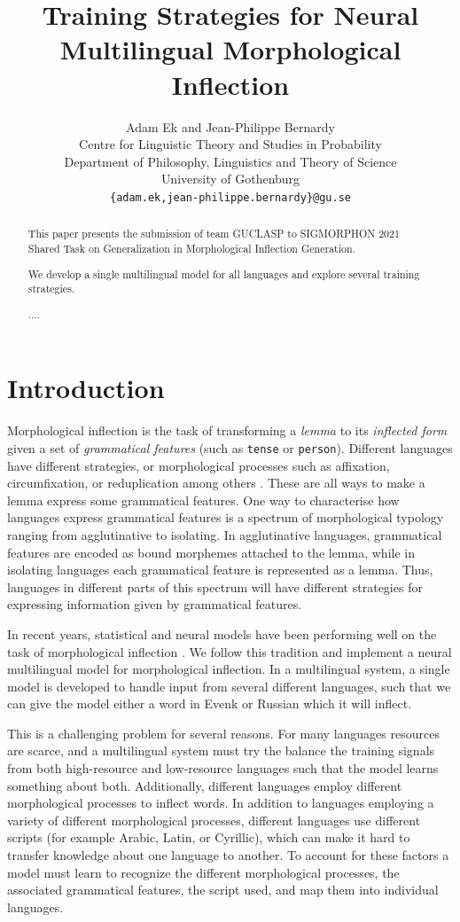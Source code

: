 \documentclass[11pt,a4paper]{article}
\title{Training Strategies for Neural Multilingual Morphological Inflection}
\author{Adam Ek and Jean-Philippe Bernardy \\
	Centre for Linguistic Theory and Studies in Probability \\
	Department of Philosophy, Linguistics and Theory of Science \\
	University of Gothenburg \\
	\texttt{\{adam.ek,jean-philippe.bernardy\}@gu.se} \\}
\date{}
\begin{document}
\maketitle
\begin{abstract}
This paper presents the submission of team GUCLASP to SIGMORPHON
2021 Shared Task on Generalization in Morphological Inflection
Generation. 

We develop a single multilingual model for all languages and explore
several training strategies.

....
\end{abstract}

\section{Introduction}

Morphological inflection is the task of transforming a \emph{lemma} to
its \emph{inflected form} given a set of \emph{grammatical features}
(such as \texttt{tense} or \texttt{person}).  Different languages have
different strategies, or morphological processes such as affixation,
circumfixation, or reduplication among others
\cite{haspelmath2013understanding}.  These are all ways to make a
lemma express some grammatical features.  One way to characterise
how languages express grammatical features is a spectrum of
morphological typology ranging from agglutinative to isolating. In
agglutinative languages, grammatical features are encoded as bound
morphemes attached to the lemma, while in isolating languages each
grammatical feature is represented as a lemma. Thus, languages in
different parts of this spectrum will have different strategies for
expressing information given by grammatical features.

In recent years, statistical and neural models have been performing
well on the task of morphological inflection
\cite{DBLP:conf/eacl/SmitVGK14, kann2016med,
DBLP:conf/conll/MakarovRC17, sharma-etal-2018-iit}. We follow this
tradition and implement a neural multilingual model for morphological
inflection. In a multilingual system, a single model is developed to
handle input from several different languages, such that we can give
the model either a word in Evenk or Russian which it will inflect.

This is a challenging problem for several reasons. For many languages
resources are scarce, and a multilingual system must try the balance
the training signals from both high-resource and low-resource
languages such that the model learns something about both.
Additionally, different languages employ different morphological
processes to inflect words. In addition to languages employing a
variety of different morphological processes, different languages use
different scripts (for example Arabic, Latin, or Cyrillic), which can
make it hard to transfer knowledge about one language to another.  To
account for these factors a model must learn to recognize the
different morphological processes, the associated grammatical
features, the script used, and map them into individual languages.
\end{document}
